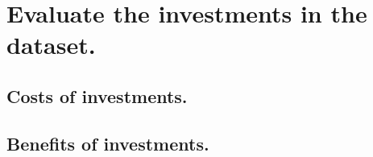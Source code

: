\documentclass[letterpaper,10pt,english]{sphinxmanual}
\begin{document}
\noindent{}


\section{Evaluate the investments in the dataset.}
\label{\detokenize{doc-src/tutorial:evaluate-the-investments-in-the-dataset}}
\begin{sphinxVerbatim}[commandchars=\\\{\}]
   
\end{sphinxVerbatim}


\subsection{Costs of investments.}
\label{\detokenize{doc-src/tutorial:costs-of-investments}}
\begin{sphinxVerbatim}[commandchars=\\\{\}]
\end{sphinxVerbatim}




\subsection{Benefits of investments.}
\label{\detokenize{doc-src/tutorial:benefits-of-investments}}
\begin{sphinxVerbatim}[commandchars=\\\{\}]
  
\end{sphinxVerbatim}



\begin{sphinxVerbatim}[commandchars=\\\{\}]
  
\end{sphinxVerbatim}
\end{document}
